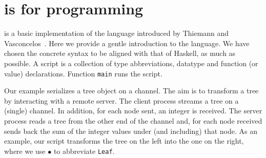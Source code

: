 \section{\freest{} is for programming}
\label{sec:programming}

\freest{} is a basic implementation of the language introduced by
Thiemann and Vasconcelos~\cite{DBLP:conf/icfp/ThiemannV16}. Here we
provide a gentle introduction to the language.
%
We have chosen the concrete syntax to be aligned with that of Haskell,
as much as possible. A \freest{} script is a collection of type
abbreviations, datatype and function (or value) declarations. Function
\lstinline|main| runs the script.

Our example serializes a tree object on a channel. The aim is to
transform a tree by interacting with a remote server. The client
process streams a tree on a (single) channel. In addition, for each
node sent, an integer is received. The server process reads a tree
from the other end of the channel and, for each node received sends
back the sum of the integer values under (and including) that
node.
%
\newcommand{\leaf}{$\bullet$}
%
As an example, our script transforms the tree on the left into the one
on the right, where we use \leaf{} to abbreviate \lstinline|Leaf|.

